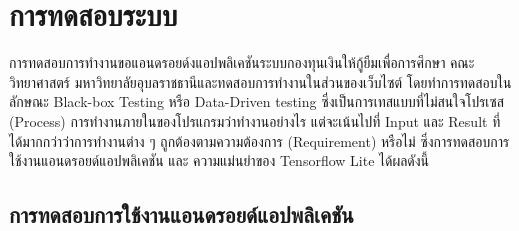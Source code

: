 \chapter{การทดสอบระบบ}
การทดสอบการทำงานขอแอนดรอยด์งแอปพลิเคชันระบบกองทุนเงินให้กู้ยืมเพื่อการศึกษา คณะวิทยาศาสตร์ มหาวิทยาลัยอุบลราชธานีและทดสอบการทำงานในส่วนของเว็บไซต์ โดยทำการทดสอบในลักษณะ Black-box Testing \cite{blackbox} หรือ Data-Driven testing ซึ่งเป็นการเทสแบบที่ไม่สนใจโปรเซส (Process) การทำงานภายในของโปรแกรมว่าทำงานอย่างไร แต่จะเน้นไปที่ Input และ Result ที่ได้มากกว่าว่าการทำงานต่าง ๆ ถูกต้องตามความต้องการ (Requirement) หรือไม่ ซึ่งการทดสอบการใช้งานแอนดรอยด์แอปพลิเคชัน และ ความแม่นยำของ Tensorflow Lite ได้ผลดังนี้

	\section{การทดสอบการใช้งานแอนดรอยด์แอปพลิเคชัน}
